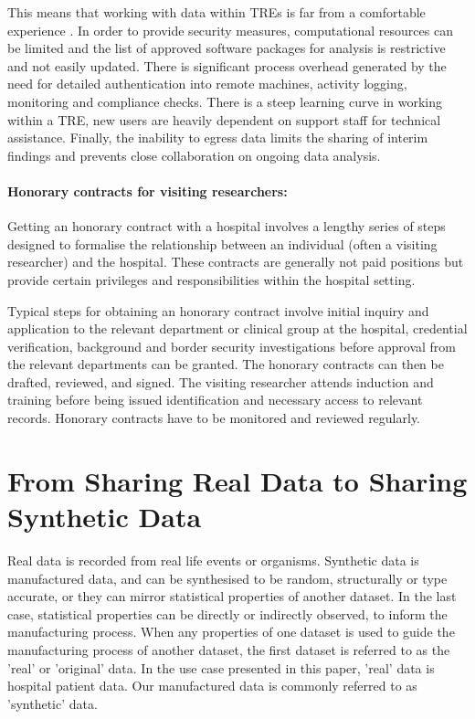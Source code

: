 \documentclass[11pt]{article}
\begin{document}
This means that working with data within TREs is far from a comfortable experience \cite{ODonovan2023}. In order to provide security measures, computational resources can be limited and the list of approved software packages for analysis is restrictive and not easily updated. There is significant process overhead generated by the need for detailed authentication into remote machines, activity logging, monitoring and compliance checks. There is a steep learning curve in working within a TRE, new users are heavily dependent on support staff for technical assistance. Finally, the inability to egress data limits the sharing of interim findings and prevents close collaboration on ongoing data analysis.

\paragraph{Honorary contracts for visiting researchers:}


Getting an honorary contract with a hospital involves a lengthy series of steps designed to formalise the relationship between an individual (often a visiting researcher) and the hospital. These contracts are generally not paid positions but provide certain privileges and responsibilities within the hospital setting. 

Typical steps for obtaining an honorary contract involve initial inquiry and application to the relevant department or clinical group at the hospital, credential verification, background and border security investigations before approval from the relevant departments can be granted. The honorary contracts can then be drafted, reviewed, and signed. The visiting researcher attends induction and training before being issued identification and necessary access to relevant records. Honorary contracts have to be monitored and reviewed regularly. 

\section{From Sharing Real Data to Sharing Synthetic Data}
Real data is recorded from real life events or organisms. Synthetic data is manufactured data, and can be synthesised to be random, structurally or type accurate, or they can mirror statistical properties of another dataset. In the last case, statistical properties can be directly or indirectly observed, to inform the manufacturing process. When any properties of one dataset is used to guide the manufacturing process of another dataset, the first dataset is referred to as the 'real' or 'original' data. In the use case presented in this paper, 'real' data is hospital patient data. Our manufactured data is commonly referred to as 'synthetic' data.
\end{document}
